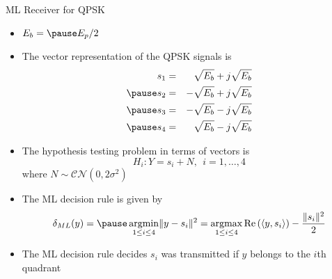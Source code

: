 \documentclass[t]{beamer}
\newcommand{\argmax}{\operatornamewithlimits{argmax}}
\newcommand{\argmin}{\operatornamewithlimits{argmin}}
\renewcommand\Re{\operatorname{Re}}
\begin{document}
\begin{frame}{ML Receiver for QPSK}
  \footnotesize
  \begin{itemize}
    \item \pause $E_b = \pause E_p/2$
    \item \pause The vector representation of the QPSK signals is
      \begin{eqnarray*}
        s_1 & = &  \sqrt{E_b} + j\sqrt{E_b} \\ \pause
        s_2 & = & -\sqrt{E_b} + j\sqrt{E_b} \\ \pause
        s_3 & = & -\sqrt{E_b} - j\sqrt{E_b} \\ \pause
        s_4 & = &  \sqrt{E_b} - j\sqrt{E_b} 
      \end{eqnarray*}
    \item \pause The hypothesis testing problem in terms of vectors is
      \begin{equation*}
        H_i  :  Y = s_i + N, \ \ i=1,\ldots,4
      \end{equation*}
      \pause where  $N \sim \mathcal{CN}(0, 2\sigma^2)$
    \item \pause The ML decision rule is given by
      \begin{eqnarray*}
        \delta_{ML}(y) = \pause \argmin_{1 \leq i \leq 4} \lVert y - s_i \rVert^2 = \argmax_{1 \leq i \leq 4} \Re\left(\langle y, s_i \rangle\right) - \frac{\lVert s_i \rVert^2}{2}
      \end{eqnarray*}
    \item \pause The ML decision rule decides $s_i$ was transmitted if $y$ belongs to the $i$th quadrant
  \end{itemize}
  \normalsize
\end{frame}
\end{document}
